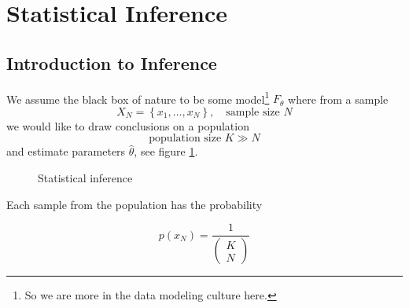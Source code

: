 \section{Statistical Inference}
\thispagestyle{plain}

\subsection{Introduction to Inference}
We assume the black box of nature
to be some model\footnote{So we are more in the data modeling culture here.} $F_\theta$ where from a sample
\begin{equation}
    X_N = \left\{ x_1,\dots,x_N \right\}, \quad \text{sample size } N
\end{equation}
we would like to draw conclusions on a population
\begin{equation}
    \text{population size } K \gg N
\end{equation}
and estimate parameters $\hat{\theta}$, see figure \ref{fig:inference}.


\begin{figure}[!htb]
 \centering
 \hfill
 \caption{Statistical inference}
 \label{fig:inference}
\end{figure}

Each sample from the population has the probability

\begin{equation}
    p(x_N) = \frac{1}{\left( \begin{array}{c}
        K \\ N
    \end{array} \right)}
\end{equation}

